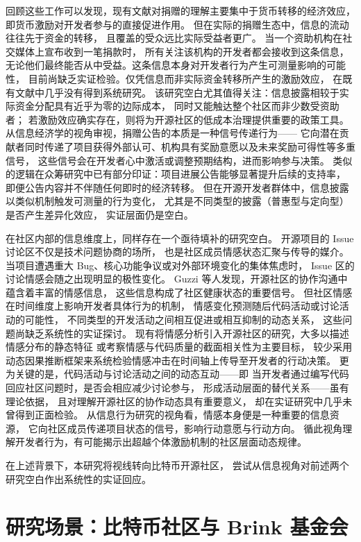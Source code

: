 回顾这些工作可以发现，现有文献对捐赠的理解主要集中于货币转移的经济效应，
即货币激励对开发者参与的直接促进作用。
但在实际的捐赠生态中，信息的流动往往先于资金的转移，
且覆盖的受众远比实际受益者更广。
当一个资助机构在社交媒体上宣布收到一笔捐款时，
所有关注该机构的开发者都会接收到这条信息，
无论他们最终能否从中受益。这条信息本身对开发者行为产生可测量影响的可能性，
目前尚缺乏实证检验。仅凭信息而非实际资金转移所产生的激励效应，
在既有文献中几乎没有得到系统研究。
该研究空白尤其值得关注：信息披露相较于实际资金分配具有近乎为零的边际成本，
同时又能触达整个社区而非少数受资助者；
若激励效应确实存在，则将为开源社区的低成本治理提供重要的政策工具。
从信息经济学的视角审视，捐赠公告的本质是一种信号传递行为——
它向潜在贡献者同时传递了项目获得外部认可、机构具有奖励意愿以及未来奖励可得性等多重信号，
这些信号会在开发者心中激活或调整预期结构，进而影响参与决策\cite{connelly2011signaling}。
类似的逻辑在众筹研究中已有部分印证：项目进展公告能够显著提升后续的支持率，
即便公告内容并不伴随任何即时的经济转移\cite{mollick2014dynamics}。
但在开源开发者群体中，信息披露以类似机制触发可测量的行为变化，
尤其是不同类型的披露（普惠型与定向型）是否产生差异化效应，
实证层面仍是空白。

在社区内部的信息维度上，同样存在一个亟待填补的研究空白。
开源项目的 Issue 讨论区不仅是技术问题协商的场所，
也是社区成员情感状态汇聚与传导的媒介。
当项目遭遇重大 Bug、核心功能争议或对外部环境变化的集体焦虑时，
Issue 区的讨论情感会随之出现明显的极性变化。
Guzzi 等人\cite{guzzi2013}发现，开源社区的协作沟通中蕴含着丰富的情感信息，
这些信息构成了社区健康状态的重要信号。
但社区情感在时间维度上影响开发者具体行为的机制，
情感变化预测随后代码活动或讨论活动的可能性，
不同类型的开发活动之间相互促进或相互抑制的动态关系，
这些问题尚缺乏系统性的实证探讨。
现有将情感分析引入开源社区的研究，大多以描述情感分布的静态特征
或考察情感与代码质量的截面相关性为主要目标\cite{guzzi2013}，
较少采用动态因果推断框架来系统检验情感冲击在时间轴上传导至开发者的行动决策。
更为关键的是，代码活动与讨论活动之间的动态互动——即
当开发者通过编写代码回应社区问题时，是否会相应减少讨论参与，
形成活动层面的替代关系——虽有理论依据，
且对理解开源社区的协作动态具有重要意义，
却在实证研究中几乎未曾得到正面检验。
从信息行为研究的视角看，情感本身便是一种重要的信息资源，
它向社区成员传递项目状态的信号，影响行动意愿与行动方向。
循此视角理解开发者行为，有可能揭示出超越个体激励机制的社区层面动态规律。

在上述背景下，本研究将视线转向比特币开源社区，
尝试从信息视角对前述两个研究空白作出系统性的实证回应。

\section{研究场景：比特币社区与 Brink 基金会}

